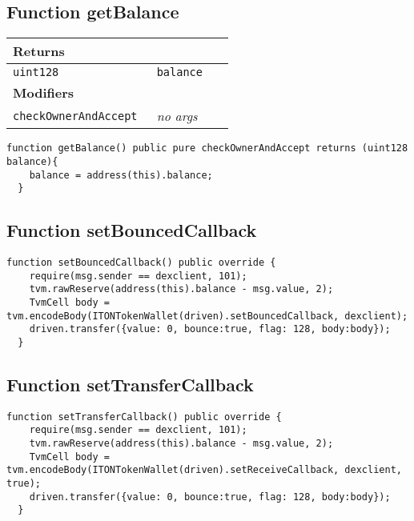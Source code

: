 \subsection{Function getBalance}


\ifsoltables
\noindent\begin{tabular}{|l|l|p{5cm}|}\hline
\multicolumn{3}{|l|}{\bf Returns}\\\hline
\tt uint128 & \tt balance &\\\hline
\multicolumn{3}{|l|}{\bf Modifiers}\\\hline
\tt checkOwnerAndAccept & {\em no args} &\\\hline
\end{tabular}
\fi

\vspace{2cm}

\begin{lstlisting}[firstnumber=124]
  function getBalance() public pure checkOwnerAndAccept returns (uint128 balance){
    balance = address(this).balance;
  }
\end{lstlisting}

\subsection{Function setBouncedCallback}

\vspace{2cm}

\begin{lstlisting}[firstnumber=95]
  function setBouncedCallback() public override {
    require(msg.sender == dexclient, 101);
    tvm.rawReserve(address(this).balance - msg.value, 2);
    TvmCell body = tvm.encodeBody(ITONTokenWallet(driven).setBouncedCallback, dexclient);
    driven.transfer({value: 0, bounce:true, flag: 128, body:body});
  }
\end{lstlisting}

\subsection{Function setTransferCallback}

\vspace{2cm}

\begin{lstlisting}[firstnumber=87]
  function setTransferCallback() public override {
    require(msg.sender == dexclient, 101);
    tvm.rawReserve(address(this).balance - msg.value, 2);
    TvmCell body = tvm.encodeBody(ITONTokenWallet(driven).setReceiveCallback, dexclient, true);
    driven.transfer({value: 0, bounce:true, flag: 128, body:body});
  }
\end{lstlisting}

